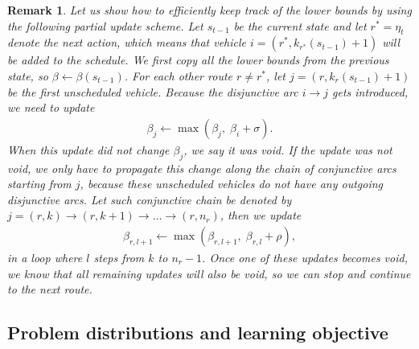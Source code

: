 \documentclass[a4paper]{report}
\theoremstyle{definition}
\theoremstyle{plain}
\newtheorem*{remark}{Remark}
\begin{document}
\begin{remark}
  Let us show how to efficiently keep track of the lower bounds by using the
  following partial update scheme.
  Let $s_{t-1}$ be the current state and let $r^* = \eta_t$ denote the next action,
  which means that vehicle $i = (r^*, k_{r^*}(s_{t-1}) + 1)$ will be added to the
  schedule.
  We first copy all the lower bounds from the previous state, so
  $\beta \leftarrow \beta(s_{t-1})$.
  For each other route $r \neq r^*$, let $j = (r, k_r(s_{t-1}) + 1)$ be the first
  unscheduled vehicle. Because the disjunctive arc $i \rightarrow j$ gets introduced, we
  need to update
  \begin{align*}
    \beta_j \leftarrow \max(\beta_j, \; \beta_i + \sigma ) .
  \end{align*}
  When this update did not change $\beta_j$, we say it was void. If the update was
  not void, we only have to propagate this change along the chain of conjunctive
  arcs starting from $j$, because these unscheduled vehicles do not have any
  outgoing disjunctive arcs. Let such conjunctive chain be denoted by
  $j = (r,k) \rightarrow (r,k+1) \rightarrow \dots \rightarrow (r,n_r)$, then we update
  \begin{align*}
    \beta_{r,l + 1} \leftarrow \max(\beta_{r,l + 1} , \; \beta_{r,l} + \rho) ,
  \end{align*}
  in a loop where $l$ steps from $k$ to $n_r - 1$. Once one of these updates
  becomes void, we know that all remaining updates will also be void, so we can
  stop and continue to the next route.
\end{remark}

\subsection{Problem distributions and learning objective}
\end{document}
